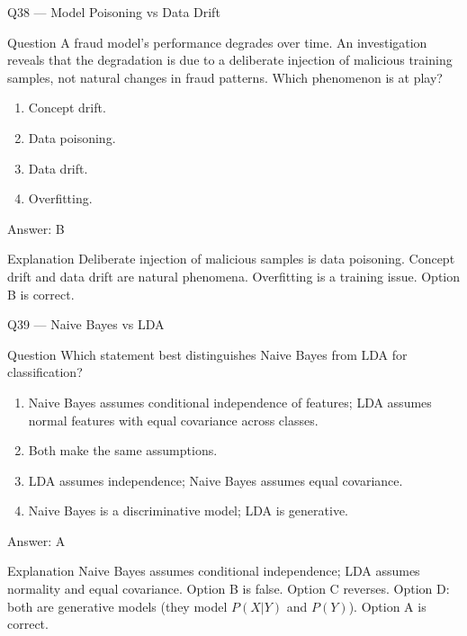 \documentclass[aspectratio=169,8pt]{beamer}
\begin{document}
	\begin{frame}{Q38 --- Model Poisoning vs Data Drift}
		\begin{block}{Question}
			A fraud model's performance degrades over time. An investigation reveals that the degradation is due to a deliberate injection of malicious training samples, not natural changes in fraud patterns. Which phenomenon is at play?
			\begin{enumerate}
				\item Concept drift.
				\item Data poisoning.
				\item Data drift.
				\item Overfitting.
			\end{enumerate}
		\end{block}
		\begin{exampleblock}{Answer: B}\end{exampleblock}
		\begin{block}{Explanation}
			Deliberate injection of malicious samples is data poisoning. Concept drift and data drift are natural phenomena. Overfitting is a training issue. Option B is correct.
		\end{block}
	\end{frame}
	
	\begin{frame}{Q39 --- Naive Bayes vs LDA}
		\begin{block}{Question}
			Which statement best distinguishes Naive Bayes from LDA for classification?
			\begin{enumerate}
				\item Naive Bayes assumes conditional independence of features; LDA assumes normal features with equal covariance across classes.
				\item Both make the same assumptions.
				\item LDA assumes independence; Naive Bayes assumes equal covariance.
				\item Naive Bayes is a discriminative model; LDA is generative.
			\end{enumerate}
		\end{block}
		\begin{exampleblock}{Answer: A}\end{exampleblock}
		\begin{block}{Explanation}
			Naive Bayes assumes conditional independence; LDA assumes normality and equal covariance. Option B is false. Option C reverses. Option D: both are generative models (they model $P(X|Y)$ and $P(Y)$). Option A is correct.
		\end{block}
	\end{frame}
	
\end{document}
